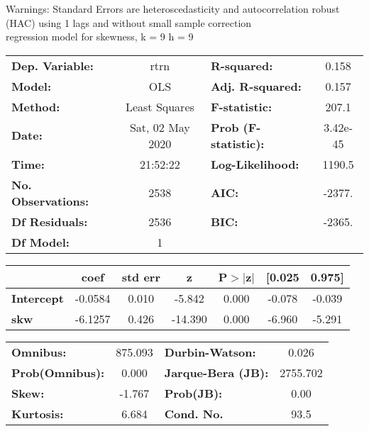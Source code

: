 Warnings: \newline
 [1] Standard Errors are heteroscedasticity and autocorrelation robust (HAC) using 1 lags and without small sample correction\\ 

regression model for skewness, k = 9 h = 9\begin{center}
\begin{tabular}{lclc}
\toprule
\textbf{Dep. Variable:}    &       rtrn       & \textbf{  R-squared:         } &     0.158   \\
\textbf{Model:}            &       OLS        & \textbf{  Adj. R-squared:    } &     0.157   \\
\textbf{Method:}           &  Least Squares   & \textbf{  F-statistic:       } &     207.1   \\
\textbf{Date:}             & Sat, 02 May 2020 & \textbf{  Prob (F-statistic):} &  3.42e-45   \\
\textbf{Time:}             &     21:52:22     & \textbf{  Log-Likelihood:    } &    1190.5   \\
\textbf{No. Observations:} &        2538      & \textbf{  AIC:               } &    -2377.   \\
\textbf{Df Residuals:}     &        2536      & \textbf{  BIC:               } &    -2365.   \\
\textbf{Df Model:}         &           1      & \textbf{                     } &             \\
\bottomrule
\end{tabular}
\begin{tabular}{lcccccc}
                   & \textbf{coef} & \textbf{std err} & \textbf{z} & \textbf{P$> |$z$|$} & \textbf{[0.025} & \textbf{0.975]}  \\
\midrule
\textbf{Intercept} &      -0.0584  &        0.010     &    -5.842  &         0.000        &       -0.078    &       -0.039     \\
\textbf{skw}       &      -6.1257  &        0.426     &   -14.390  &         0.000        &       -6.960    &       -5.291     \\
\bottomrule
\end{tabular}
\begin{tabular}{lclc}
\textbf{Omnibus:}       & 875.093 & \textbf{  Durbin-Watson:     } &    0.026  \\
\textbf{Prob(Omnibus):} &   0.000 & \textbf{  Jarque-Bera (JB):  } & 2755.702  \\
\textbf{Skew:}          &  -1.767 & \textbf{  Prob(JB):          } &     0.00  \\
\textbf{Kurtosis:}      &   6.684 & \textbf{  Cond. No.          } &     93.5  \\
\bottomrule
\end{tabular}
\end{center}

